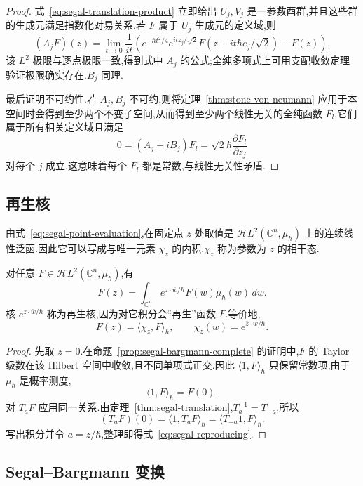 {\begin{proof}
式~\eqref{eq:segal-translation-product} 立即给出 $U_j,V_j$ 是一参数酉群,并且这些群的生成元满足指数化对易关系.若 $F$ 属于 $U_j$ 生成元的定义域,则
\[
(A_jF)(z)=\lim_{t\to0}\frac1{it}\left(e^{-\hbar t^2/4}e^{itz_j/\sqrt2}F(z+it\hbar e_j/\sqrt2)-F(z)\right).
\]
该 $L^2$ 极限与逐点极限一致,得到式中 $A_j$ 的公式;全纯多项式上可用支配收敛定理验证极限确实存在.$B_j$ 同理.

最后证明不可约性.若 $A_j,B_j$ 不可约,则将定理~\ref{thm:stone-von-neumann} 应用于本空间时会得到至少两个不变子空间,从而得到至少两个线性无关的全纯函数 $F_l$,它们属于所有相关定义域且满足
\[
0=(A_j+iB_j)F_l=\sqrt2\hbar\frac{\partial F_l}{\partial z_j}
\]
对每个 $j$ 成立.这意味着每个 $F_l$ 都是常数,与线性无关性矛盾.
\end{proof}

\subsection{再生核}
\label{subsec:segal-reproducing-kernel}

由式~\eqref{eq:segal-point-evaluation},在固定点 $z$ 处取值是 $\mathcal H L^2(\mathbb C^n,\mu_\hbar)$ 上的连续线性泛函.因此它可以写成与唯一元素 $\chi_z$ 的内积.$\chi_z$ 称为参数为 $z$ 的相干态.

\begin{proposition}\label{prop:segal-reproducing-kernel}
对任意 $F\in\mathcal H L^2(\mathbb C^n,\mu_\hbar)$,有
\[
F(z)=\int_{\mathbb C^n}e^{z\cdot\bar w/\hbar}F(w)\mu_\hbar(w)\,dw.
\label{eq:segal-reproducing}
\]
核 $e^{z\cdot\bar w/\hbar}$ 称为再生核,因为对它积分会“再生”函数 $F$.等价地,
\[
F(z)=\langle\chi_z,F\rangle_\hbar,
\qquad
\chi_z(w)=e^{\bar z\cdot w/\hbar}.
\]
\end{proposition}

\begin{proof}
先取 $z=0$.在命题~\ref{prop:segal-bargmann-complete} 的证明中,$F$ 的 Taylor 级数在该 Hilbert 空间中收敛,且不同单项式正交.因此 $\langle1,F\rangle_\hbar$ 只保留常数项;由于 $\mu_\hbar$ 是概率测度,
\[
\langle1,F\rangle_\hbar=F(0).
\]
对 $T_aF$ 应用同一关系.由定理~\ref{thm:segal-translation},$T_a^{-1}=T_{-a}$,所以
\[
(T_aF)(0)=\langle1,T_aF\rangle_\hbar=\langle T_{-a}1,F\rangle_\hbar.
\]
写出积分并令 $a=z/\hbar$,整理即得式~\eqref{eq:segal-reproducing}.
\end{proof}

\subsection{Segal--Bargmann 变换}
\label{subsec:segal-bargmann-transform}

}
